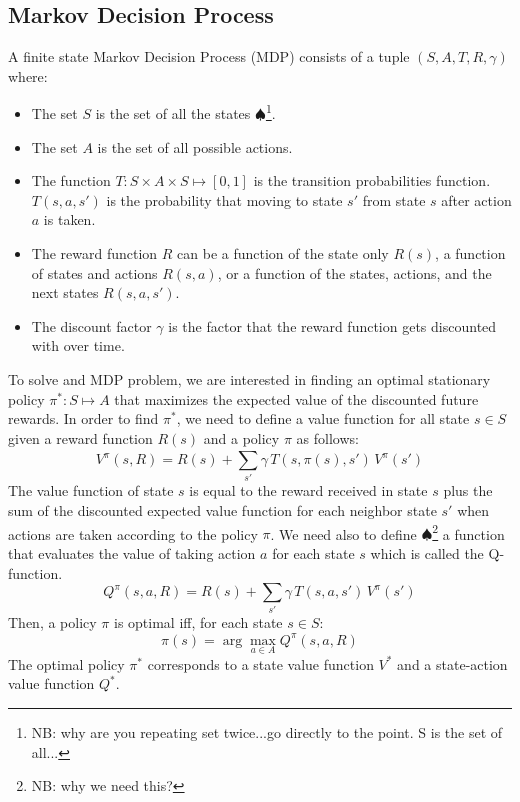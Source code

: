 \documentclass[conference]{IEEEtran}
\newcommand\NB[1]{$\spadesuit$\footnote{NB: #1}}
\begin{document}
\subsection{Markov Decision Process}
A finite state Markov Decision Process (MDP) \cite{puterman2014markov} consists of a tuple $(S,A,T,R,\gamma)$ where:
\begin{itemize}
    \item The set $S$ is the set of all the states \NB{why are you repeating set twice...go directly to the point. S is the set of all...}.
    \item The set $A$ is the set of all possible actions.
    \item The function $T : S\times A\times S \mapsto [0,1]$ is the transition probabilities function. $T(s,a,s')$ is the probability that moving to state $s'$ from state $s$ after action $a$ is taken.
    \item The reward function $R$ can be a function of the state only $R(s)$, a function of states and actions $R(s,a)$, or a function of the states, actions, and the next states $R(s,a,s')$.
    \item The discount factor $\gamma$ is the factor that the reward function gets discounted with over time.
\end{itemize}
To solve and MDP problem, we are interested in finding an optimal stationary policy $\pi^*: S \mapsto A$ that maximizes the expected value of the discounted future rewards.
In order to find $\pi^*$, we need to define a value function for all state $s \in S$ given a reward function $R(s)$ and a policy $\pi$ as follows:
\[ V^\pi(s,R) = R(s) + \sum_{s'}^{}\gamma\,T(s,\pi(s),s')\,V^\pi(s') \]
The value function of state $s$ is equal to the reward received in state $s$ plus the sum of the discounted expected value function for each neighbor state $s'$ when actions are taken according to the policy $\pi$.
We need also to define \NB{why we need this?} a function that evaluates the value of taking action $a$ for each state $s$ which is called the Q-function.
\[Q^\pi(s,a,R) = R(s) + \sum_{s'}{} \gamma\,T(s,a,s')\,V^\pi(s') \]
Then, a policy $\pi$ is optimal iff, for each state $s \in S$:
\[ \pi(s) = \arg\!\max_{a\in A} Q^\pi(s,a,R)\]
The optimal policy $\pi^*$ corresponds to a state value function $V^*$ and a state-action value function $Q^*$.
\end{document}
